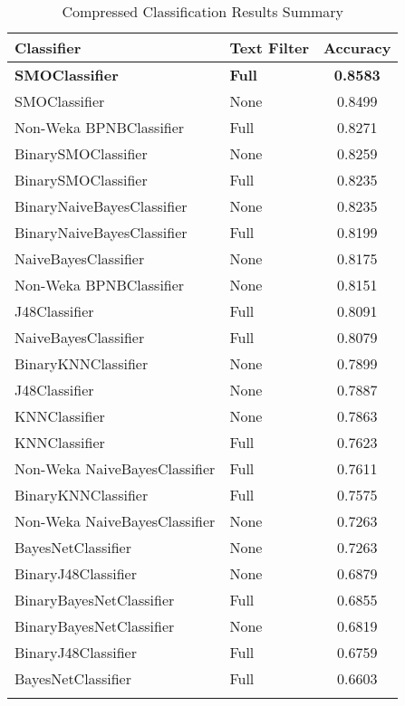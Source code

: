 \begin{center}
   \begin{longtable}{|l|l|c|}
      \hline
         Classifier & Text Filter & Accuracy
      \tabularnewline\hline
         \textbf{SMOClassifier} & \textbf{Full} & \textbf{0.8583}
      \tabularnewline\hline
         SMOClassifier & None & 0.8499
      \tabularnewline\hline
         Non-Weka BPNBClassifier & Full & 0.8271
      \tabularnewline\hline
         BinarySMOClassifier & None & 0.8259
      \tabularnewline\hline
         BinarySMOClassifier & Full & 0.8235
      \tabularnewline\hline
         BinaryNaiveBayesClassifier & None & 0.8235
      \tabularnewline\hline
         BinaryNaiveBayesClassifier & Full & 0.8199
      \tabularnewline\hline
         NaiveBayesClassifier & None & 0.8175
      \tabularnewline\hline
         Non-Weka BPNBClassifier & None & 0.8151
      \tabularnewline\hline
         J48Classifier & Full & 0.8091
      \tabularnewline\hline
         NaiveBayesClassifier & Full & 0.8079
      \tabularnewline\hline
         BinaryKNNClassifier & None & 0.7899
      \tabularnewline\hline
         J48Classifier & None & 0.7887
      \tabularnewline\hline
         KNNClassifier & None & 0.7863
      \tabularnewline\hline
         KNNClassifier & Full & 0.7623
      \tabularnewline\hline
         Non-Weka NaiveBayesClassifier & Full & 0.7611
      \tabularnewline\hline
         BinaryKNNClassifier & Full & 0.7575
      \tabularnewline\hline
         Non-Weka NaiveBayesClassifier & None & 0.7263
      \tabularnewline\hline
         BayesNetClassifier & None & 0.7263
      \tabularnewline\hline
         BinaryJ48Classifier & None & 0.6879
      \tabularnewline\hline
         BinaryBayesNetClassifier & Full & 0.6855
      \tabularnewline\hline
         BinaryBayesNetClassifier & None & 0.6819
      \tabularnewline\hline
         BinaryJ48Classifier & Full & 0.6759
      \tabularnewline\hline
         BayesNetClassifier & Full & 0.6603
      \tabularnewline\hline
      \caption[Compressed Classification Results Summary]{Compressed Classification Results Summary}
      \label{table:classification-summary-compressed}
   \end{longtable}
\end{center}

